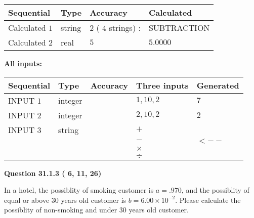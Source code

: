 \documentclass[12pt]{article}
\begin{document}
  
\noindent\begin{tabular}{|l|l|l|l|}
\hline
 Sequential & Type & Accuracy & Calculated \\ 
\hline
 
 
  Calculated $           1$ & string & $           2 $ ( $          4 $ strings)
 : 
 & SUBTRACTION
 \\  \hline  
 
 
  Calculated $           2$ & real & $           5 $ & 
 $ 5.0000 $ 
 \\  \hline  
 \end{tabular}
   
   
   
   
\noindent\vspace{0.1in}\hspace{-0.08in} {\textbf{\Large{All inputs: }}}
   
   
  
  
\noindent\begin{tabular}{|l|l|l|l|l|}
\hline
 Sequential & Type & Accuracy & Three inputs & Generated \\ 
\hline
 
 
  INPUT $           1$ & integer &  & $
 1
 , 
 10
 , 
 2
 $ & $ 7 $ 
 \\  \hline  
 
 
  INPUT $           2$ & integer &  & $
 2
 , 
 10
 , 
 2
 $ & $ 2 $ 
 \\  \hline  
 
 
  INPUT $           3$ & string & & 
 $+$ & 
  \\
  & & & 
 $-$ & 
  $ <-- $ 
  \\
  & & & 
 $\times$ & 
  \\
  & & & 
 $\div$ & 
 \\  \hline  
 \end{tabular}
   
   
  
\vspace{0.2in}
  
{\textbf{\Large{Question
31.1.3 
 (          6,         11,         26)
}}}
  
  
In a hotel, the possiblity of  %
smoking customer is
$a =  %
.970$, and the possiblity of  %
equal or above 30 years old customer is $ b =  %
6.00 \times 10^{-2}$.
Please calculate the possiblity of  %
 non-smoking and  %
under 30 years old customer.
 
 
 
\noindent{}
 
\end{document}
